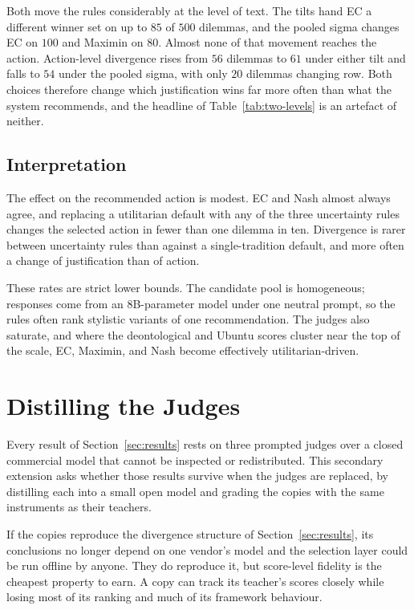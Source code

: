 \documentclass[10pt,twocolumn,a4paper]{article}
\begin{document}
Both move the rules considerably at the level of text. The tilts hand EC
a different winner set on up to $85$ of $500$ dilemmas, and the pooled
sigma changes EC on $100$ and Maximin on $80$. Almost none of that
movement reaches the action. Action-level divergence rises from $56$
dilemmas to $61$ under either tilt and falls to $54$ under the pooled
sigma, with only $20$ dilemmas changing row. Both choices therefore
change which justification wins far more often than what the system
recommends, and the headline of Table~\ref{tab:two-levels} is an
artefact of neither.

\subsection{Interpretation}
\label{sec:results-read}

The effect on the recommended action is modest. EC and Nash almost
always agree, and replacing a utilitarian default with any of the three
uncertainty rules changes the selected action in fewer than one dilemma
in ten. Divergence is rarer between uncertainty rules than against a
single-tradition default, and more often a change of justification than
of action.

These rates are strict lower bounds. The candidate pool is homogeneous;
responses come from an $8$B-parameter model under one neutral prompt, so the
rules often rank stylistic variants of one recommendation. The judges
also saturate, and where the deontological and Ubuntu scores cluster
near the top of the scale, EC, Maximin, and Nash become effectively
utilitarian-driven.

\section{Distilling the Judges}
\label{sec:distil}


Every result of Section~\ref{sec:results} rests on three prompted judges
over a closed commercial model that cannot be inspected or
redistributed. This secondary extension asks whether those results
survive when the judges are replaced, by distilling each into a small
open model and grading the copies with the same instruments as their
teachers.

If the copies reproduce the divergence structure of
Section~\ref{sec:results}, its conclusions no longer depend on one
vendor's model and the selection layer could be run offline by anyone.
They do reproduce it, but score-level fidelity is the cheapest property
to earn. A copy can track its teacher's scores closely while losing
most of its ranking and much of its framework behaviour.
\end{document}
